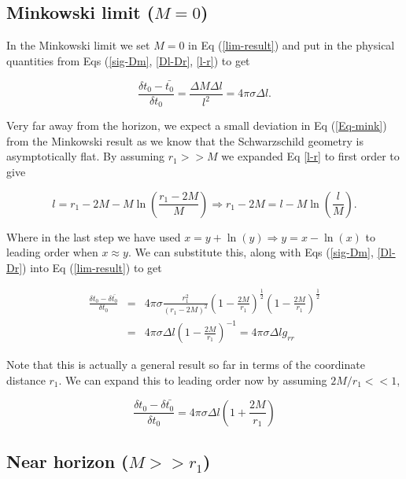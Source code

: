 \documentclass[aps,showpacs,onecolumn,floats,prd,superscriptaddress,nofootinbib]{revtex4-1}
\begin{document}
\subsection{Minkowski limit ($M=0$)}

In the Minkowski limit we set $M=0$ in Eq (\ref{lim-result}) and put in the physical quantities from Eqs (\ref{sig-Dm}, \ref{Dl-Dr}, \ref{l-r}) to get

\begin{equation}
	\frac{\delta t_0 - \bar{t_0}}{\delta t_0} = \frac{\Delta M \Delta l}{l^2} = 4 \pi \sigma \Delta l.	\label{Eq-mink}
\end{equation}

Very far away from the horizon, we expect a small deviation in Eq (\ref{Eq-mink}) from the Minkowski result as we know that the Schwarzschild geometry is asymptotically flat. By assuming $r_1>>M$ we  expanded Eq \ref{l-r} to first order to give

\begin{equation}
	l = r_1 - 2M - M \ln \left( \frac{r_1 - 2M}{M} \right) \Rightarrow r_1 - 2M = l - M \ln \left( \frac{l}{M} \right)	\label{l-r1}.
\end{equation}

Where in the last step we have used $x = y + \ln (y) \Rightarrow y = x - \ln(x)$ to leading order when $x \approx y$. We can substitute this, along with Eqs (\ref{sig-Dm}, \ref{Dl-Dr}) into Eq (\ref{lim-result}) to get

\begin{eqnarray}
	\frac{\delta t_0 - \delta \bar{t_0}}{\delta t_0} & = & 4 \pi \sigma \frac{r_1^2}{(r_1 - 2M)^2} \left( 1 - \frac{2M}{r_1} \right)^{\frac{1}{2}} \left( 1 - \frac{2M}{r_1} \right)^\frac{1}{2}  \nonumber	\\
	& = & 4 \pi \sigma \Delta l \left( 1 - \frac{2M}{r_1} \right)^{-1} = 4 \pi \sigma \Delta l g_{rr}	\label{gen-result}
\end{eqnarray}

Note that this is actually a general result so far in terms of the coordinate distance $r_1$. We can expand this to leading order now by assuming $2M/r_1 <<1$,

\begin{equation}
	\frac{\delta t_0 - \delta \bar{t_0}}{\delta t_0} = 4 \pi \sigma \Delta l \left( 1 + \frac{2M}{r_1} \right) 
\end{equation}

\subsection{Near horizon ($M>>r_1$)}
\end{document}
